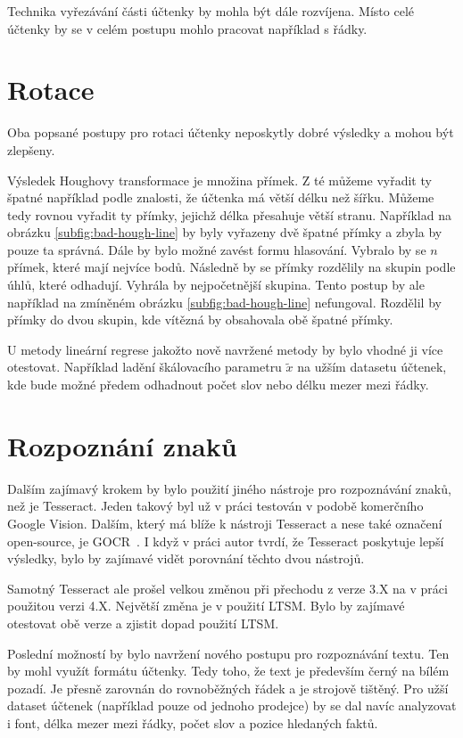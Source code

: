 \documentclass[thesis=B,czech]{FITthesis}[2019/12/23]
\begin{document}
Technika vyřezávání části účtenky by mohla být dále rozvíjena. Místo celé účtenky by se v celém postupu mohlo pracovat například s řádky.

\section{Rotace}
Oba popsané postupy pro rotaci účtenky neposkytly dobré výsledky a mohou být zlepšeny.

Výsledek Houghovy transformace je množina přímek. Z té můžeme vyřadit ty špatné například podle znalosti, že účtenka má větší délku než šířku. Můžeme tedy rovnou vyřadit ty přímky, jejichž délka přesahuje větší stranu. Například na obrázku \ref{subfig:bad-hough-line} by byly vyřazeny dvě špatné přímky a zbyla by pouze ta správná. Dále by bylo možné zavést formu hlasování. Vybralo by se $n$ přímek, které mají nejvíce bodů. Následně by se přímky rozdělily na skupin podle úhlů, které odhadují. Vyhrála by nejpočetnější skupina. Tento postup by ale například na zmíněném obrázku \ref{subfig:bad-hough-line} nefungoval. Rozdělil by přímky do dvou skupin, kde vítězná by obsahovala obě špatné přímky.

U metody lineární regrese jakožto nově navržené metody by bylo vhodné ji více otestovat. Například ladění škálovacího parametru $\tilde{x}$  na užším datasetu účtenek, kde bude možné předem odhadnout počet slov nebo délku mezer mezi řádky.

\section{Rozpoznání znaků}

Dalším zajímavý krokem by bylo použití jiného nástroje pro rozpoznávání znaků, než je Tesseract. Jeden takový byl už v práci testován v podobě komerčního Google Vision. Dalším, který má blíže k nástroji Tesseract a nese také označení open-source, je GOCR~\cite{schulenburgGOCR2000}. I když v práci \cite{dhimanTesseractVsGocr2013a} autor tvrdí, že Tesseract poskytuje lepší výsledky, bylo by zajímavé vidět porovnání těchto dvou nástrojů.

Samotný Tesseract ale prošel velkou změnou při přechodu z verze 3.X na v práci použitou verzi 4.X. Největší změna je v použití LTSM. Bylo by zajímavé otestovat obě verze a zjistit dopad použití LTSM.

Poslední možností by bylo navržení nového postupu pro rozpoznávání textu. Ten by mohl využít formátu účtenky. Tedy toho, že text je především černý na bílém pozadí. Je přesně zarovnán do rovnoběžných řádek a je strojově tištěný. Pro užší dataset účtenek (například pouze od jednoho prodejce) by se dal navíc analyzovat i font, délka mezer mezi řádky, počet slov a pozice hledaných faktů.
\end{document}
